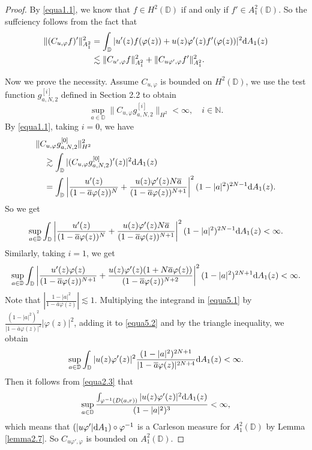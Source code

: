 \documentclass[preprint,12pt,times]{elsarticle}
\theoremstyle{definition}
\theoremstyle{remark}
\numberwithin{equation}{section}
\begin{document}
\begin{proof}
By \eqref{equa1.1}, we know that $f\in H^2(\mathbb{D})$ if and only if $f'\in A_1^2(\mathbb{D})$. So the suffciency follows from the fact that 
\begin{align*}
\|(C_{u,\varphi}f)'\|_{A_1^2}^2&=\int_{\mathbb{D}}|u'(z)f(\varphi(z))+u(z)\varphi'(z)f'(\varphi(z))|^2{\rm d}A_1(z)\\
&\lesssim \|C_{u',\varphi}f\|_{A_1^2}^2+\|C_{u\varphi',\varphi}f'\|_{A_{1}^2}^2.
\end{align*}

Now we prove the necessity. Assume $C_{u,\varphi}$ is bounded on $H^2(\mathbb{D})$, we use the test function $g_{a,N,2}^{[i]}$ defined in Section 2.2 to obtain
$$\sup_{a\in\mathbb{D}}\|C_{u,\varphi}g_{a,N,2}^{[i]}\|_{H^2}<\infty,\quad i\in\mathbb{N}.$$
By \eqref{equa1.1}, taking $i=0$, we have
\begin{align*}
&\|C_{u,\varphi}g_{a,N,2}^{[0]}\|_{H^2}^2\\
&\quad \gtrsim \int_{\mathbb{D}}|(C_{u,\varphi}g_{a,N,2}^{[0]})'(z)|^2{\rm d}A_1(z)\\
&\quad =\int_{\mathbb{D}}\left|\frac{u'(z)}{(1-\overline{a}\varphi(z))^N}+\frac{u(z)\varphi'(z)N\overline{a}}{(1-\overline{a}\varphi(z))^{N+1}}\right|^2(1-|a|^2)^{2N-1}{\rm d}A_1(z).
\end{align*}
So we get
\begin{align}\label{equa5.1}
\sup_{a\in\mathbb{D}}\int_{\mathbb{D}}\left|\frac{u'(z)}{(1-\overline{a}\varphi(z))^N}+\frac{u(z)\varphi'(z)N\overline{a}}{(1-\overline{a}\varphi(z))^{N+1}}\right|^2(1-|a|^2)^{2N-1}{\rm d}A_1(z)<\infty.
\end{align}
Similarly, taking $i=1$, we get
\begin{align}\label{equa5.2}
\sup_{a\in\mathbb{D}}\int_{\mathbb{D}}\left|\frac{u'(z)\varphi(z)}{(1-\overline{a}\varphi(z))^{N+1}}+\frac{u(z)\varphi'(z)(1+N\overline{a}\varphi(z))}{(1-\overline{a}\varphi(z))^{N+2}}\right|^2(1-|a|^2)^{2N+1}{\rm d}A_1(z)<\infty.
\end{align}
Note that $\left|\frac{1-|a|^2}{1-\overline{a}\varphi(z)}\right|\lesssim 1$. Multiplying the integrand in \eqref{equa5.1} by $\frac{(1-|a|^2)^2}{|1-\overline{a}\varphi(z)|^2}|\varphi(z)|^2$, adding it to \eqref{equa5.2} and by the triangle inequality, we obtain
\begin{align}\label{equa5.3}
\sup_{a\in\mathbb{D}}\int_{\mathbb{D}}|u(z)\varphi'(z)|^2\frac{(1-|a|^2)^{2N+1}}{|1-\overline{a}\varphi(z)|^{2N+4}}{\rm d}A_1(z)<\infty.
\end{align}
Then it follows from \eqref{equa2.3} that
\begin{align}\label{equa5.4}
\sup_{a\in\mathbb{D}}\frac{\int_{\varphi^{-1}(D(a,r))}|u(z)\varphi'(z)|^2{\rm d}A_1(z)}{(1-|a|^2)^3}<\infty,
\end{align}
which means that $(|u\varphi'|{\rm d}A_1)\circ\varphi^{-1}$ is a Carleson measure for $A_1^2(\mathbb{D})$ by Lemma \ref{lemma2.7}. So $C_{u\varphi',\varphi}$ is bounded on $A_1^2(\mathbb{D})$.


\end{proof}
\end{document}
